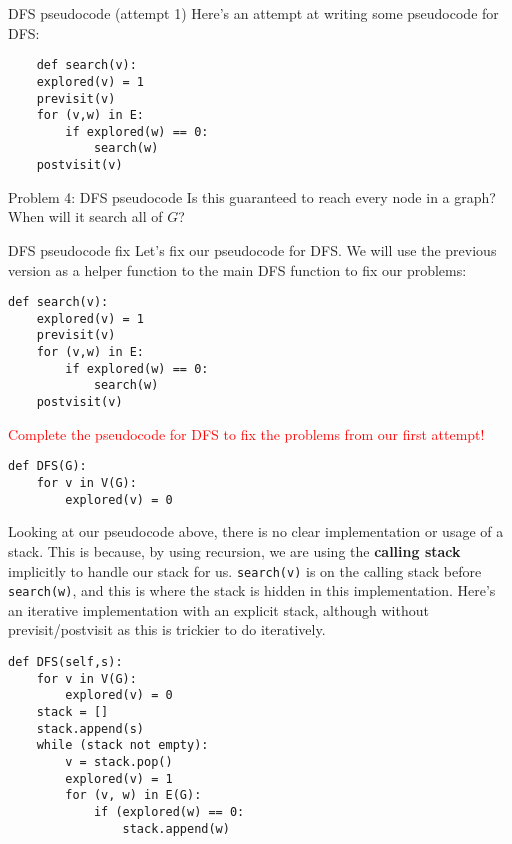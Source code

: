 \documentclass{article}
\begin{document}
\begin{strategy}{DFS pseudocode (attempt 1)}
    Here's an attempt at writing some pseudocode for DFS:
    \begin{lstlisting}
    def search(v):
	explored(v) = 1
	previsit(v)
	for (v,w) in E:
		if explored(w) == 0:
			search(w)
	postvisit(v)
\end{lstlisting}
\end{strategy}
\begin{problem}{Problem 4: DFS pseudocode}
    Is this guaranteed to reach every node in a graph? When will it search all of $G$?
\end{problem}


\newpage
\begin{strategy}{DFS pseudocode fix}
    Let's fix our pseudocode for DFS. We will use the previous version as a helper function to the main DFS function to fix our problems:
    \begin{lstlisting}[mathescape=true]
def search(v):
    explored(v) = 1
    previsit(v)
    for (v,w) in E:
        if explored(w) == 0:
            search(w)
    postvisit(v)
    \end{lstlisting}  

    \textcolor{red}{Complete the pseudocode for DFS to fix the problems from our first attempt!}
    \begin{lstlisting}
def DFS(G):
    for v in V(G):
        explored(v) = 0
    \end{lstlisting}
    \vspace{-3mm}
    \begin{tcolorbox}
    \vspace{2cm}
    \end{tcolorbox}
\end{strategy}

\begin{note}
    Looking at our pseudocode above, there is no clear implementation or usage of a stack. This is because, by using recursion, we are using the \textbf{calling stack} implicitly to handle our stack for us. \lstinline{search(v)} is on the calling stack before \lstinline{search(w)}, and this is where the stack is hidden in this implementation. Here's an iterative implementation with an explicit stack, although without previsit/postvisit as this is trickier to do iteratively.

    \begin{lstlisting}
def DFS(self,s):
    for v in V(G):
        explored(v) = 0
    stack = []
    stack.append(s)
    while (stack not empty):
        v = stack.pop()
        explored(v) = 1
        for (v, w) in E(G):
            if (explored(w) == 0:
                stack.append(w)
    \end{lstlisting}
    
\end{note}
\end{document}
